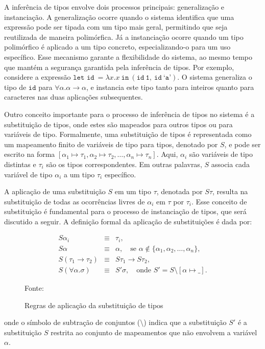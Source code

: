 A inferência de tipos envolve dois processos principais: generalização e instanciação.
A generalização ocorre quando o sistema identifica que uma expressão pode ser tipada com um tipo mais geral, permitindo que seja reutilizada de maneira polimórfica.
Já a instanciação ocorre quando um tipo polimórfico é aplicado a um tipo concreto, especializando-o para um uso específico.
Esse mecanismo garante a flexibilidade do sistema, ao mesmo tempo que mantém a segurança garantida pela inferência de tipos.
Por exemplo, considere a expressão $\texttt{let id} \ = \lambda x.x \ \texttt{in} \ (\texttt{id} \ \texttt{1}, \ \texttt{id} \ \texttt{`a'})$.
O sistema generaliza o tipo de $\texttt{id}$ para $\forall \alpha. \alpha \rightarrow \alpha$, e instancia este tipo tanto para inteiros quanto para caracteres nas duas aplicações subsequentes.

Outro conceito importante para o processo de inferência de tipos no sistema é a substituição de tipos, onde estes são mapeados para outros tipos ou para variáveis de tipo.
Formalmente, uma substituição de tipos é representada como um mapeamento finito de variáveis de tipo para tipos, denotado por $S$, e pode ser escrito na forma $[ \alpha_1 \mapsto \tau_1, \alpha_2 \mapsto \tau_2, \ldots, \alpha_n \mapsto \tau_n ]$.
Aqui, $\alpha_i$ são variáveis de tipo distintas e $\tau_i$ são os tipos correspondentes.
Em outras palavras, $S$ associa cada variável de tipo $\alpha_i$ a um tipo $\tau_i$ específico.

A aplicação de uma substituição $S$ em um tipo $\tau$, denotada por $S\tau$, resulta na substituição de todas as ocorrências livres de $\alpha_i$ em $\tau$ por $\tau_i$.
Esse conceito de substituição é fundamental para o processo de instanciação de tipos, que será discutido a seguir.
A definição formal da aplicação de substituições é dada por:

\begin{figure}[ht!]
  \centering
  \[
    \begin{array}{rcl}
      S\alpha_i                    & \equiv & \tau_i,                                                                          \\[8pt]
      S\alpha                      & \equiv & \alpha, \quad \text{se } \alpha \notin \{\alpha_1, \alpha_2, \ldots, \alpha_n\}, \\[8pt]
      S(\tau_1 \rightarrow \tau_2) & \equiv & S\tau_1 \rightarrow S\tau_2,                                                     \\[8pt]
      S(\forall \alpha.\sigma)     & \equiv & S' \sigma, \quad \text{onde } S' = S \setminus [\alpha \mapsto \_].
    \end{array}
    \]\label{fig:substituicao-tipos}
    \caption{Regras de aplicação da substituição de tipos}
    \small{Fonte:~\cite{castro2019certificacao}}
\end{figure}
\noindent onde o símbolo de subtração de conjuntos ($\setminus$) indica que a substituição $S'$ é a substituição $S$ restrita ao conjunto de mapeamentos que não envolvem a variável $\alpha$.

